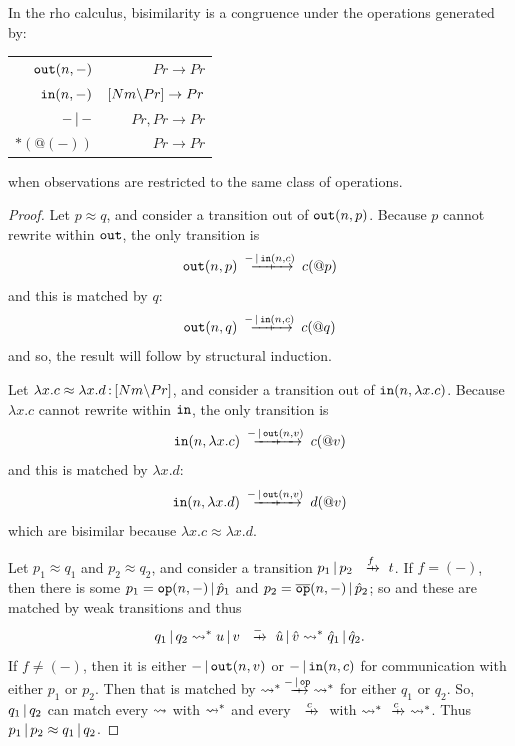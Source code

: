\documentclass{article}
\begin{document}
\begin{theorem}
    In the rho calculus, bisimilarity is a congruence under the operations generated by:
    \begin{center}
        \renewcommand{\arraystretch}{1.2}
        \begin{tabular}{rr}
             $\mathtt{out}(n,-)$ & $Pr\to Pr$\\
            $\mathtt{in}(n,-)$ & $[Nm{\setminus} Pr]\to Pr$\\
            $-\,|\, -$ & $Pr,Pr\to Pr$\\
            $\ast(@(-))$ & $Pr\to Pr$
        \end{tabular}
    \end{center}
    when observations are restricted to the same class of operations.
\end{theorem}
\begin{proof}
    Let $p\approx q$, and consider a transition out of $\mathtt{out}(n,p)$. Because $p$ cannot rewrite within $\mathtt{out}$, the only transition is
    \[\tout(n,p) \xr{-\pr \tin(n,c)} c(@p)\]
    and this is matched by $q$:
    \[\tout(n,q)\xr{-\pr \tin(n,c)} c(@q)\]
    and so, the result will follow by structural induction.

    Let $\lambda x.c\approx \lambda x.d\,{:}\, [Nm{\setminus} Pr]$, and consider a transition out of $\mathtt{in}(n,\lambda x.c)$. Because $\lambda x.c$ cannot rewrite within $\mathtt{in}$, the only transition is
    \[\tin(n,\lambda x.c)\xr{-\pr \tout(n,v)} c(@v)\]
    and this is matched by $\lambda x.d$:
    \[\tin(n,\lambda x.d) \xr{-\pr \tout(n,v)} d(@v)\]
    which are bisimilar because $\lambda x.c\approx \lambda x.d$.

    Let $p_1\approx q_1$ and $p_2\approx q_2$, and consider a transition $p_1\pr p_2\xr{f} t$. If $f = (-)$, then there is some $p_1= \mathtt{op}(n,-)\,|\, \hat{p}_1$ and $p_2 = \overline{\mathtt{op}}(n,-)\,|\, \hat{p}_2$; so
    and these are matched by weak transitions
    and thus
    \[q_1\pr q_2\rsq^\ast u\pr v\xr{-} \hat{u}\pr \hat{v}\rsq^\ast \hat{q}_1\pr \hat{q}_2.\]
    If $f\neq (-)$, then it is either $-\,|\, \mathtt{out}(n,v)$ or $-\,|\, \mathtt{in}(n,c)$ for communication with either $p_1$ or $p_2$. Then that is matched by $\rsq^\ast \xr{-\pr \mtt{op}}\rsq^\ast$ for either $q_1$ or $q_2$. 
    So, $q_1\,|\, q_2$ can match every $\rightsquigarrow$ with $\rightsquigarrow^\ast$ and every $\xr{c}$ with $\rsq^
    \ast \xr{c}\rsq^\ast$. Thus $p_1\,|\, p_2\approx q_1\,|\, q_2$.
\end{proof}
\end{document}
